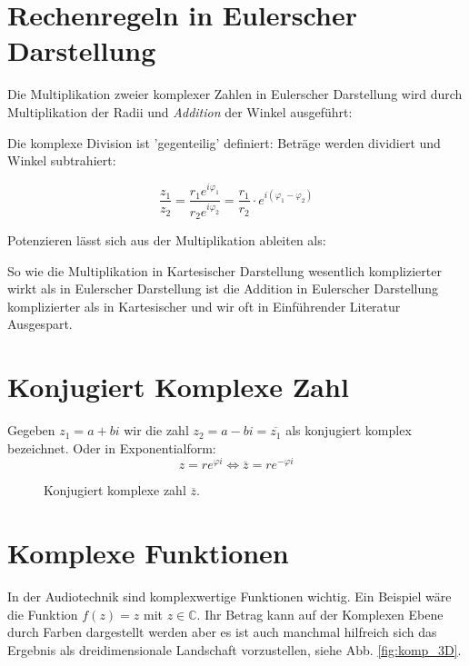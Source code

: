 \section{Rechenregeln in Eulerscher Darstellung}

Die Multiplikation zweier komplexer Zahlen in Eulerscher Darstellung wird durch Multiplikation der Radii und \emph{Addition} der Winkel ausgeführt:


Die komplexe Division ist 'gegenteilig' definiert: Beträge werden dividiert und Winkel subtrahiert:

$$\frac{z_1}{z_2} = \frac{r_1e^{i\varphi_1}} { r_2e^{i\varphi_2}} =  \frac{r_1}{ r_2} \cdot e^{i (\varphi_1 - \varphi_2)}$$


Potenzieren lässt sich aus der Multiplikation ableiten als: 


So wie die Multiplikation in Kartesischer Darstellung wesentlich komplizierter wirkt als in Eulerscher Darstellung ist die Addition in Eulerscher Darstellung komplizierter als in Kartesischer und wir oft in Einführender Literatur Ausgespart.


\section{Konjugiert Komplexe Zahl}
Gegeben $z_1 = a + bi$ wir die zahl $z_2 = a - bi = \overline{z_1}$ als konjugiert komplex bezeichnet. Oder in Exponentialform:
$$z = re^{\varphi i} \iff \overline{z} = re^{-\varphi i}$$

\begin{figure}[h]
	\centering
	
	\caption{Konjugiert komplexe zahl $\overline{z}$.}
	\label{fig:komp_conju}
\end{figure}


\section{Komplexe Funktionen}
In der Audiotechnik sind komplexwertige Funktionen wichtig. Ein Beispiel wäre die Funktion $f(z) = z$ mit $z \in \mathbb{C}$. Ihr Betrag kann auf der Komplexen Ebene durch Farben dargestellt werden aber es ist auch manchmal hilfreich sich das Ergebnis als dreidimensionale Landschaft vorzustellen, siehe Abb. \ref{fig:komp_3D}. 

